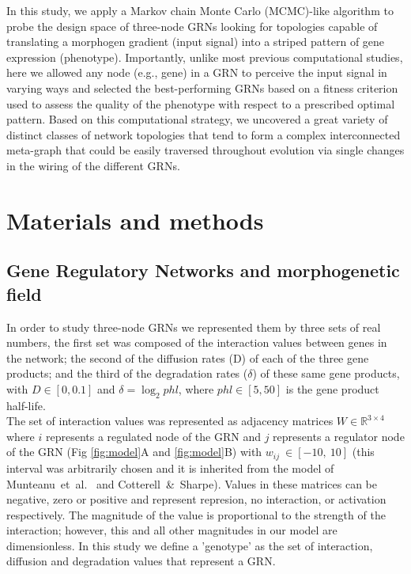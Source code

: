 \documentclass[10pt,letterpaper]{article}
\begin{document}
In this study, we apply a Markov chain Monte Carlo (MCMC)-like algorithm to
probe the design space of three-node GRNs looking for topologies capable of
translating a morphogen gradient  (input signal) into a striped pattern of gene
expression (phenotype). Importantly, unlike most previous computational
studies, here we allowed any node (e.g., gene) in a GRN to perceive the input
signal in varying ways and selected the best-performing GRNs based on a
fitness criterion used to assess the quality of the phenotype with respect to
a prescribed optimal pattern. Based on this computational strategy, we uncovered
a great variety of distinct classes of network topologies that
tend to form a complex interconnected meta-graph that could be easily
traversed throughout evolution via single changes in the wiring of the
different GRNs.

\section*{Materials and methods}
\subsection*{Gene Regulatory Networks and morphogenetic field}

In order to study three-node GRNs we represented them by three sets of real
numbers, the first set was composed of the interaction values
between genes in the network; the second of the diffusion rates (D) of each of
the three gene products; and the third of the degradation rates ($\delta$) of
these same gene products, with $D \in [0, 0.1]$ and $\delta = \log_{2}phl$, where
$phl \in [5, 50]$ is the gene product half-life.\\

The set of interaction values was represented as adjacency matrices $W \in
\mathbb{R}^{3\times4}$ where $i$ represents a regulated node of the GRN and $j$
represents a regulator node of the GRN (Fig \ref{fig:model}A and
\ref{fig:model}B) with $w_{\textit{ij}}~\in [-10,\ 10]$ (this interval was arbitrarily
chosen and it is inherited from the model of Munteanu~et~al.~\cite{munteanu_2014}
and Cotterell~\&~Sharpe\cite{Cotterell2010}). Values in these
matrices can be negative, zero or positive and represent represion, no
interaction, or activation respectively. The magnitude of the value is
proportional to the strength of the interaction; however, this and all other
magnitudes in our model are dimensionless. In this study we define
a 'genotype' as the set of interaction, diffusion and degradation values that
represent a GRN.\\
\end{document}
